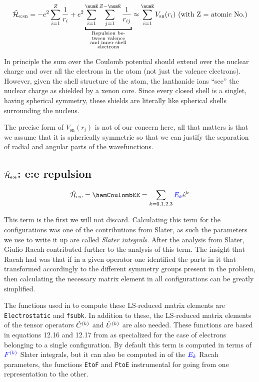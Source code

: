\documentclass{article}
\newcommand{\codetext}[1]{{\color{BlueViolet} \texttt{#1}}}
\begin{document}
\begin{equation}
\hamNuclearCoulombSymbol = -e^2 \sum_{i=1}^{Z} \frac{1}{r_{i}} + e^2 \underbracket{\sum_{i=1}^{\numE}\sum_{j=1}^{Z-\numE} \frac{1}{r_{ij}}}_{\substack{
        \text{Repulsion be-} \\
        \text{tween valence} \\
        \text{and inner shell} \\
        \text{electrons} 
        }
      } \approx \sum_{i=1}^\numE V_\text{sn}(r_i) \text{ (with Z = atomic No.)}
\end{equation}


In principle the sum over the Coulomb potential should extend over the nuclear charge and over all the electrons in the atom (not just the valence electrons). However, given the shell structure of the atom, the lanthanide ions ``see'' the nuclear charge as shielded by a xenon core. Since every closed shell is a singlet, having spherical symmetry, these shields are literally like spherical shells surrounding the nucleus.

	The precise form of $V_\text{sn}(r_i)$ is not of our concern here, all that matters is that we assume that it is spherically symmetric so that we can justify the separation of radial and angular parts of the wavefunctions.

\subsection{$\hat{\mathcal{H}}_\text{e:e}$: e:e repulsion}
 
    \begin{equation}
        \hamCoulombEESymbol = \hamCoulombEE = \sum_{k=0,1,2,3} \Ek \hat{e}^k 
    \end{equation}  

    This term is the first we will not discard. Calculating this term for the \fn configurations was one of the contributions from Slater, as such the parameters we use to write it up are called \textit{Slater integrals}. After the analysis from Slater, Giulio Racah contributed further to the analysis of this term. The insight that Racah had was that if in a given operator one identified the parts in it that transformed accordingly to the different symmetry groups present in the problem, then calculating the necessary matrix element in all \fn configurations can be greatly simplified.

    The functions used in \ql to compute these LS-reduced matrix elements are \codetext{Electrostatic} and \codetext{fsubk}. In addition to these, the LS-reduced matrix elements of the tensor operators $\hat{C}^{(k)}$ and $\hat{U}^{(k)}$ are also needed. These functions are based in equations 12.16 and 12.17 from \cite{cowan_theory_1981} as specialized for the case of electrons belonging to a single \fn configuration. By default this term is computed in terms of $\textcolor{blue}{{F^{(k)}}}$ Slater integrals, but it can also be computed in of the $\textcolor{blue}{{E_{k}}}$ Racah parameters, the functions \codetext{EtoF} and \codetext{FtoE} instrumental for going from one representation to the other.
    
\end{document}

